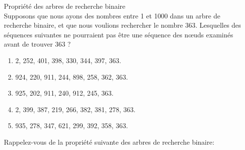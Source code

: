     \begin{Exercice}[10 minutes] Propriété des arbres de recherche binaire\\

    Supposons que nous ayons des nombres entre 1 et 1000 dans un arbre de recherche binaire, et que nous voulions rechercher le nombre 363. Lesquelles des séquences suivantes ne pourraient pas être une séquence des nœuds examinés avant de trouver 363 ?

    \begin{enumerate}
        \item 2, 252, 401, 398, 330, 344, 397, 363.
        \item 924, 220, 911, 244, 898, 258, 362, 363.
        \item 925, 202, 911, 240, 912, 245, 363.
        \item 2, 399, 387, 219, 266, 382, 381, 278, 363.
        \item 935, 278, 347, 621, 299, 392, 358, 363. 
    \end{enumerate}

    \begin{conseil}
        Rappelez-vous de la propriété suivante des arbres de recherche binaire:
        \begin{center}
\end{center}
\end{conseil}
\end{Exercice}
